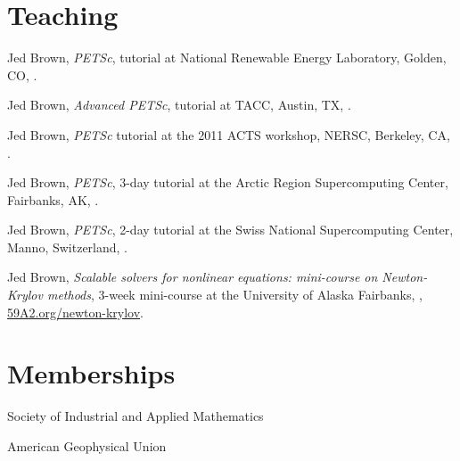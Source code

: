\documentclass[10pt,letterpaper]{article}
\newcommand\ptitle[1]{\textit{#1}} %
\renewenvironment{itemize}{
  \begin{list}{}{
    \setlength{\leftmargin}{1.5em}
    \setlength{\itemsep}{0.25em}
    \setlength{\parskip}{0pt}
    \setlength{\parsep}{0.25em}
  }
}{
  \end{list}
}
\begin{document}
\section*{Teaching}
\begin{itemize}
\item Jed Brown, \ptitle{PETSc}, tutorial at National Renewable Energy Laboratory, Golden, CO, .
\item Jed Brown, \ptitle{Advanced PETSc}, tutorial at TACC, Austin, TX, .
\item Jed Brown, \ptitle{PETSc} tutorial at the 2011 ACTS workshop, NERSC, Berkeley, CA, .
\item Jed Brown, \ptitle{PETSc}, 3-day tutorial at the Arctic Region Supercomputing Center, Fairbanks, AK, .
\item Jed Brown, \ptitle{PETSc}, 2-day tutorial at the Swiss National Supercomputing Center, Manno, Switzerland, .
\item Jed Brown, \ptitle{Scalable solvers for nonlinear equations: mini-course on Newton-Krylov methods}, 3-week mini-course at the University of Alaska Fairbanks, , \href{http://59A2.org/newton-krylov/}{\url{59A2.org/newton-krylov}}.
\end{itemize}

\section*{Memberships}
\begin{itemize}
\item Society of Industrial and Applied Mathematics
\item American Geophysical Union
\end{itemize}
\end{document}
